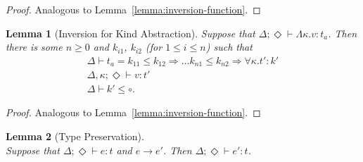\documentclass{article}
\newcommand{\KVAR}{\kappa}
\newcommand{\ONE}{\circ}
\newcommand{\KALL}[1]{\forall#1.}
\newcommand{\KLAM}[1]{\Lambda#1.}
\newcommand{\KENV}{\Delta}
\newcommand{\TENVEMPTY}{\Diamond}
\newcommand\stepsto{\longrightarrow}
\newtheorem{lemma}{Lemma}
\begin{document}
\begin{proof}
  Analogous to Lemma~\ref{lemma:inversion-function}.
\end{proof}
\begin{lemma}[Inversion for Kind Abstraction]\label{lemma:inversion-kind-abstraction}
  Suppose that $\KENV; \TENVEMPTY \vdash \KLAM\KVAR v : t_a$.
  Then there is some $n\ge0$ and $k_{i1}$, $k_{i2}$ (for $1\le i\le n$) such that 
  \begin{gather}
    \KENV \vdash t_a = k_{11}\le k_{12}\Rightarrow \dots k_{n1}\le k_{n2} \Rightarrow \KALL \KVAR t' : k'
    \\
    \KENV, \KVAR; \TENVEMPTY \vdash v : t'
    \\
    \KENV \vdash k' \le \ONE
    \mathrm{.}
  \end{gather}
\end{lemma}
\begin{proof}
  Analogous to Lemma~\ref{lemma:inversion-function}.
\end{proof}
\begin{lemma}[Type Preservation]~\\
  Suppose that $\KENV; \TENVEMPTY \vdash e : t$ and $e \stepsto e'$.
  Then $\KENV;\TENVEMPTY \vdash e' : t$.
\end{lemma}
\end{document}
